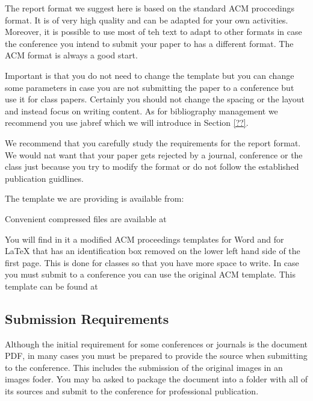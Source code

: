 The report format we suggest here is based on the standard ACM
proccedings format. It is of very high quality and can be adapted for
your own activities. Moreover, it is possible to use most of teh text to
adapt to other formats in case the conference you intend to submit your
paper to has a different format. The ACM format is always a good start.

Important is that you do not need to change the template but you can
change some parameters in case you are not submitting the paper to a
conference but use it for class papers. Certainly you should not change
the spacing or the layout and instead focus on writing content. As for
bibliography management we recommend you use jabref which we will
introduce in Section \ref{??}.

We recommend that you carefully study the requirements for the report
format. We would nat want that your paper gets rejected by a journal,
conference or the class just because you try to modify the format or do
not follow the established publication guidlines.

The template we are providing is available from:


Convenient compressed files are available at


You will find in it a modified ACM proceedings templates for Word and
for LaTeX that has an identification box removed on the lower left hand
side of the first page. This is done for classes so that you have more
space to write. In case you must submit to a conference you can use the
original ACM template. This template can be found at

\subsection{Submission Requirements}\label{submission-requirements}

Although the initial requirement for some conferences or journals is the
document PDF, in many cases you must be prepared to provide the source
when submitting to the conference. This includes the submission of the
original images in an images foder. You may ba asked to package the
document into a folder with all of its sources and submit to the
conference for professional publication.

